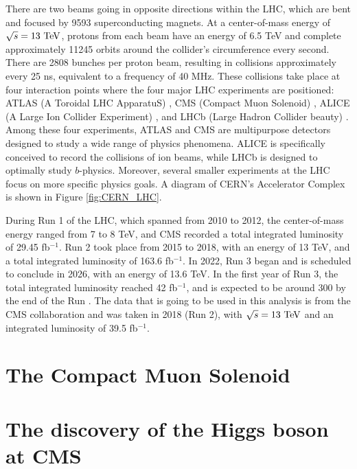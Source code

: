 There are two beams going in opposite directions within the LHC, which are bent and focused by 9593 superconducting magnets. At a center-of-mass energy of $\sqrt{s} = 13\ \TeV$, protons from each beam have an energy of 6.5 TeV and complete approximately 11245 orbits around the collider's circumference every second. There are 2808 bunches per proton beam, resulting in collisions approximately every 25 ns, equivalent to a frequency of 40 MHz. These collisions take place at four interaction points where the four major LHC experiments are positioned:  ATLAS (A Toroidal LHC ApparatuS) \cite{ATLAS:1994vge}, CMS (Compact Muon Solenoid) \cite{CMS:1994hea}, ALICE (A Large Ion Collider Experiment) \cite{413235}, and LHCb (Large Hadron Collider beauty) \cite{LHCb:1998kcv}. Among these four experiments, ATLAS and CMS are multipurpose detectors designed to study a wide range of physics phenomena. ALICE is specifically conceived to record the collisions of ion beams, while LHCb is designed to optimally study $b$-physics. Moreover, several smaller experiments at the LHC focus on more specific physics goals. A diagram of CERN's Accelerator Complex is shown in Figure \ref{fig:CERN_LHC}.

During Run 1 of the LHC, which spanned from 2010 to 2012, the center-of-mass energy ranged from 7 to 8 TeV, and CMS recorded a total integrated luminosity of 29.45 fb$^{-1}$. Run 2 took place from 2015 to 2018, with an energy of 13 TeV, and a total integrated luminosity of 163.6 fb$^{-1}$. In 2022, Run 3 began and is scheduled to conclude in 2026, with an energy of 13.6 TeV. In the first year of Run 3, the total integrated luminosity reached 42 fb$^{-1}$, and is expected to be around 300 by the end of the Run \cite{CMS:luminosity}. The data that is going to be used in this analysis is from the CMS collaboration and was taken in 2018 (Run 2), with $\sqrt{s} = 13\ \TeV$ and an integrated luminosity of 39.5 fb$^{-1}$.

\section{The Compact Muon Solenoid}





\section{The discovery of the Higgs boson at CMS}


